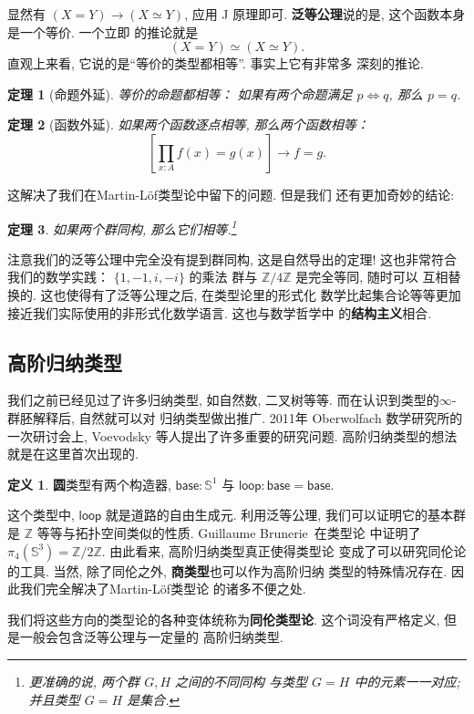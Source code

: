 \documentclass[UTF8]{ctexbook}
\newcommand{\cons}[1]{\textsf{#1}}
\theoremstyle{plain}
\newtheorem{theorem}{定理}[chapter]
\theoremstyle{definition}
\newtheorem{definition}{定义}[chapter]
\theoremstyle{remark}
\begin{document}
显然有 \((X = Y) \to (X \simeq Y)\), 应用 J 原理即可.
\textbf{泛等公理}说的是, 这个函数本身是一个等价. 一个立即
的推论就是
\[(X = Y) \simeq (X \simeq Y).\]
直观上来看, 它说的是“等价的类型都相等”. 事实上它有非常多
深刻的推论.
\begin{theorem}[命题外延]
等价的命题都相等： 如果有两个命题满足
\(p \iff q\), 那么 \(p = q\).
\end{theorem}
\begin{theorem}[函数外延]
如果两个函数逐点相等, 那么两个函数相等：
\[\left[\prod_{x:A} f(x) = g(x)\right] \to f = g.\]
\end{theorem}
这解决了我们在Martin-L\"of类型论中留下的问题. 但是我们
还有更加奇妙的结论:
\begin{theorem}
如果两个群同构, 那么它们相等.\footnote{更准确的说, 两个群 \(G, H\) 之间的不同同构
与类型 \(G = H\) 中的元素一一对应; 并且类型 \(G = H\) 是集合.}
\end{theorem}
注意我们的泛等公理中完全没有提到群同构, 这是自然导出的定理!
这也非常符合我们的数学实践： \(\{1,-1,i,-i\}\) 的乘法
群与 \(\mathbb Z/4\mathbb Z\) 是完全等同, 随时可以
互相替换的. 这也使得有了泛等公理之后, 在类型论里的形式化
数学比起集合论等等更加接近我们实际使用的非形式化数学语言.
这也与数学哲学中
的\textbf{结构主义}相合.~\cite{awodey:2013:structuralism}

\subsection{高阶归纳类型}
我们之前已经见过了许多归纳类型, 如自然数, 二叉树等等.
而在认识到类型的\(\infty\)-群胚解释后, 自然就可以对
归纳类型做出推广. 2011年 Oberwolfach 数学研究所的
一次研讨会上, Voevodsky 等人提出了许多重要的研究问题.
高阶归纳类型的想法就是在这里首次出现的.

\begin{definition}
\textbf{圆}类型有两个构造器, \(\cons{base} : \mathbb S^1\)
与 \(\cons{loop} : \cons{base} = \cons{base}\).
\end{definition}
这个类型中, \(\cons{loop}\) 就是道路的自由生成元.
利用泛等公理, 我们可以证明它的基本群是 \(\mathbb Z\)
等等与拓扑空间类似的性质. Guillaume Brunerie~\cite{brunerie:2016:number}在类型论
中证明了 \(\pi_4(\mathbb S^3) = \mathbb Z / 2\mathbb Z\).
由此看来, 高阶归纳类型真正使得类型论
变成了可以研究同伦论的工具.
当然, 除了同伦之外, \textbf{商类型}也可以作为高阶归纳
类型的特殊情况存在. 因此我们完全解决了Martin-L\"of类型论
的诸多不便之处.

我们将这些方向的类型论的各种变体统称为\textbf{同伦类型论}.
这个词没有严格定义, 但是一般会包含泛等公理与一定量的
高阶归纳类型.
\end{document}
